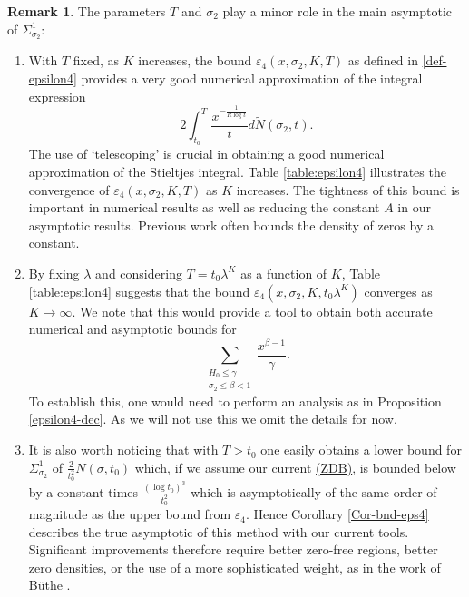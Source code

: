 \documentclass[10pt]{amsart}
\newcommand{\s}{\sigma}
\theoremstyle{definition}
\newtheorem{Rem}[prop]{Remark}
\numberwithin{equation}{section}
\begin{document}
\begin{Rem}
The parameters $T$ and $\s_2$ play a minor role in the main asymptotic of $\Sigma_{\sigma_2}^1$:
\begin{enumerate}
\item 
With $T$ fixed, as $K$ increases, the bound $\varepsilon_4(x,\s_2,K,T) $ as defined in \eqref{def-epsilon4}  provides a very good numerical approximation of the integral expression 
\[2 \int_{t_0}^T  \frac{x^{-\frac{1}{R\log t }}}{t} d\tilde N(\sigma_2,t).
\]
The use of `telescoping' is crucial in obtaining a good numerical  approximation of the Stieltjes integral.
Table \ref{table:epsilon4} illustrates the convergence of $\varepsilon_4(x,\s_2,K,T) $ as $K$ increases.
The tightness of this bound is important in numerical  results as well as reducing the constant $A$ in our asymptotic results. Previous work often bounds the density of zeros by a constant. 
\item
By fixing $\lambda$ and considering $T = t_0\lambda^K$ as a function of $K$, 
Table \ref{table:epsilon4} suggests that the bound $\varepsilon_4(x,\s_2,K,t_0 \lambda^K) $ converges as $K\to \infty$.
We note that this would provide a tool to obtain both accurate numerical and asymptotic bounds for 
\[
\sum_{\substack{ H_0 \le \gamma \\ \s_2 \le \beta <1}}  \frac{x^{\beta-1}}{\gamma}  . \]
To establish this, one would need to %
perform an analysis as in Proposition \ref{epsilon4-dec}.
As we will not use this we omit the details for now.
\item
It is also worth noticing that with $T > t_0$ one easily obtains a lower bound for $\Sigma_{\s_2}^{1}$ of $ \frac{2}{t_0^2}  N(\sigma,t_0) $
which, if we assume our current \hyperref[ZDB]{(ZDB)}, is bounded below by a constant times $\frac{(\log t_0)^{3}}{t_0^2} $
which is asymptotically of the same order of magnitude as the upper bound from $\varepsilon_4$.
Hence Corollary \ref{Cor-bnd-eps4} describes the true asymptotic of this method with our current tools.
Significant improvements therefore require better zero-free regions, better zero densities, or the use of a more sophisticated weight, as in the work of B\"uthe \cite{Bu16}.
\end{enumerate}
\end{Rem}
\end{document}
